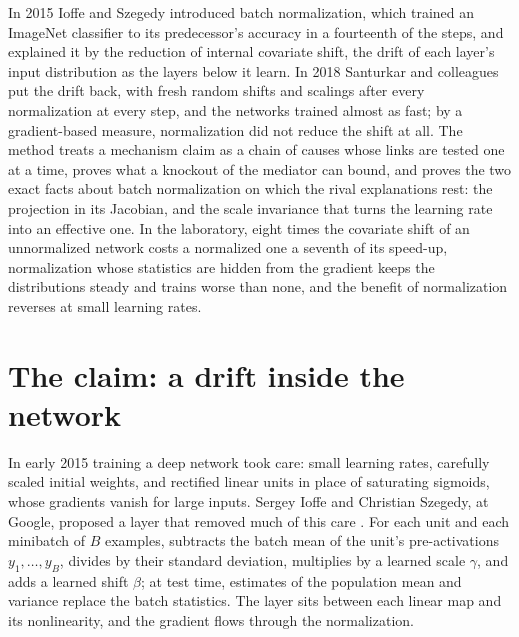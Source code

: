 \newcommand{\mechanismsones}{\mathbf{1}}
\begin{refsection}

\begin{chaptersummary}
In 2015 Ioffe and Szegedy introduced batch normalization, which trained an ImageNet classifier to its predecessor's accuracy in a fourteenth of the steps, and explained it by the reduction of internal covariate shift, the drift of each layer's input distribution as the layers below it learn. In 2018 Santurkar and colleagues put the drift back, with fresh random shifts and scalings after every normalization at every step, and the networks trained almost as fast; by a gradient-based measure, normalization did not reduce the shift at all. The method treats a mechanism claim as a chain of causes whose links are tested one at a time, proves what a knockout of the mediator can bound, and proves the two exact facts about batch normalization on which the rival explanations rest: the projection in its Jacobian, and the scale invariance that turns the learning rate into an effective one. In the laboratory, eight times the covariate shift of an unnormalized network costs a normalized one a seventh of its speed-up, normalization whose statistics are hidden from the gradient keeps the distributions steady and trains worse than none, and the benefit of normalization reverses at small learning rates.
\end{chaptersummary}

\section{The claim: a drift inside the network}\label{sec:mechanisms:claim}

In early 2015 training a deep network took care: small learning rates, carefully scaled initial weights, and rectified linear units in place of saturating sigmoids, whose gradients vanish for large inputs. Sergey Ioffe and Christian Szegedy, at Google, proposed a layer that removed much of this care \parencite{IoffeSzegedy2015}. For each unit and each minibatch of $B$ examples,  subtracts the batch mean of the unit's pre-activations $y_1,\dots,y_B$, divides by their standard deviation, multiplies by a learned scale $\gamma$, and adds a learned shift $\beta$; at test time, estimates of the population mean and variance replace the batch statistics. The layer sits between each linear map and its nonlinearity, and the gradient flows through the normalization.


\end{refsection}

